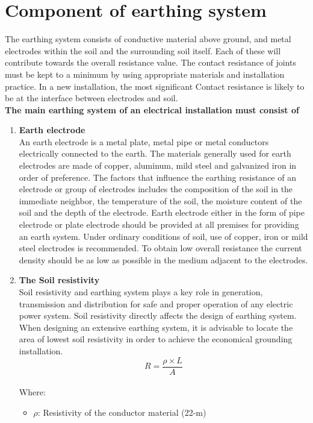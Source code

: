 \documentclass[12pt,fleqn]{book} %
\begin{document}
\section{Component of earthing system}
The earthing system consists of conductive material above ground, and metal electrodes within the soil and the surrounding soil itself. Each of these will contribute towards the overall resistance value. The contact resistance of joints must be kept to a minimum by using appropriate materials and installation practice. In a new installation, the most significant Contact resistance is likely to be at the interface between electrodes and soil.
\\ \textbf{The main earthing system of an electrical installation must consist of}
\begin{enumerate}
    \item \textbf{Earth electrode}
    \\ An earth electrode is a metal plate, metal pipe or metal conductors electrically connected to the earth. The materials generally used for earth electrodes are made of copper, aluminum, mild steel and galvanized iron in order of preference. The factors that influence the earthing resistance of an electrode or group of electrodes includes the composition of the soil in the immediate neighbor, the temperature of the soil, the moisture content of the soil and the depth of the electrode. Earth electrode either in the form of pipe electrode or plate electrode should be provided at all premises for providing an earth system. Under ordinary conditions of soil, use of copper, iron or mild steel electrodes is recommended. To obtain low overall resistance the current density should be as low as possible in the medium adjacent to the electrodes.
    \item \textbf{The Soil resistivity}
    \\ Soil resistivity and earthing system plays a key role in generation, transmission and distribution for safe and proper operation of any electric power system. Soil resistivity directly affects the design of earthing system. When designing an extensive earthing system, it is advisable to locate the area of lowest soil resistivity in order to achieve the economical grounding installation.
    \begin{equation}
        R=\frac{\rho\times L}{A}
    \end{equation}
    \\Where:
    \begin{itemize}
        \item $\rho$:  Resistivity of the conductor material (22-m)

\end{itemize}
\end{enumerate}
\end{document}
